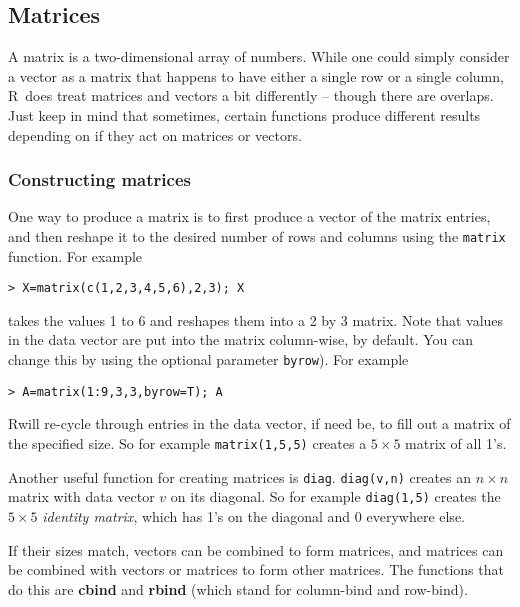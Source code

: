 \documentclass [11pt]{article}
\newcommand\R{{\sf R}}
\numberwithin{exercise}{section}
\begin{document}
\subsection{Matrices}
A matrix is a two-dimensional array of numbers. While one could simply consider a vector as a matrix that happens to have either a single row or a single column, \R\ does treat matrices and vectors a bit differently -- though there are overlaps. Just keep in mind that sometimes, certain functions produce different results depending on if they act on matrices or vectors.

\subsubsection{Constructing matrices}

One way to produce a matrix is to first produce a vector of the matrix 
entries, and then reshape it to the desired number of rows
and columns using the \texttt{matrix} function. For example 
\begin{verbatim}
> X=matrix(c(1,2,3,4,5,6),2,3); X
\end{verbatim}
takes the values 1 to 6 and reshapes them into a 2 by 3 matrix. 
Note that values in the data vector are put into the matrix 
column-wise, by default. You can change this by using the optional
parameter {\tt byrow}). For example 
\begin{verbatim}
> A=matrix(1:9,3,3,byrow=T); A
\end{verbatim}
\R will re-cycle through entries in the data vector, if need be,
to fill out a matrix of the specified size. So for example 
\texttt{matrix(1,5,5)} creates a $5 \times 5$ matrix of all 1's.

Another useful function for creating matrices is \texttt{diag}.
\texttt{diag(v,n)} creates an $n \times n$ matrix with data
vector $v$ on its diagonal. So for example \texttt{diag(1,5)}
creates the $5 \times 5$ \textit{identity matrix}, which has 1's on
the diagonal and 0 everywhere else.

If their sizes match, vectors can be combined to form matrices, and matrices
can be combined with vectors or matrices to form other matrices. The functions
that do this are \textbf{cbind} and \textbf{rbind} (which stand for column-bind and row-bind). 
\end{document}
